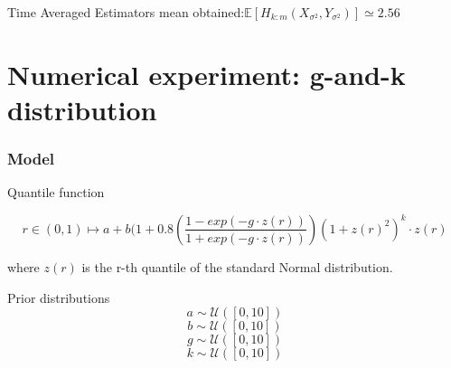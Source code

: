 \documentclass{beamer}
\begin{document}
\begin{frame}
	
%	
	\vspace{3mm}
	\small
	\centering
	Time Averaged Estimators mean obtained:$\mathbb{E}[H_{k:m}(X_{\sigma^2}, Y_{\sigma^2})] \simeq 2.56   %
	$
	
\end{frame}

	
\section{Numerical experiment: g-and-k distribution}

\begin{frame}[plain]{}
	\sectionpage
\end{frame}
	\begin{frame}
		\frametitle{Model}
		\begin{block}{Quantile function}
			
			$$ r \in (0,1) \longmapsto   a + b (1+0.8\left(\frac{1-exp(-g \cdot z(r))}{1+exp(-g\cdot z(r))}\right)(1+ z(r)^{2})^k\cdot z(r)  $$
		\end{block}	
		where $ z(r)$ is the r-th quantile of the standard Normal distribution. 
		\begin{block}{Prior distributions}
			$$ a \sim \mathcal{U}([0,10])	$$
			$$ b \sim \mathcal{U}([0,10])	$$
			$$ g \sim \mathcal{U}([0,10])	$$
			$$k \sim \mathcal{U}([0,10])    $$
		\end{block}
	\end{frame}
	
\end{document}
